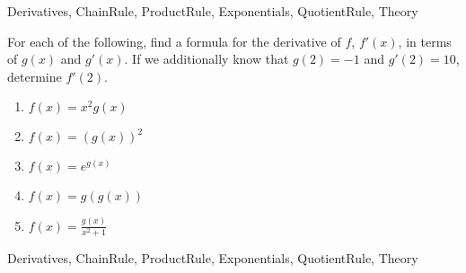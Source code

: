 	
\begin{tagblock}{Derivatives, ChainRule, ProductRule, Exponentials, QuotientRule, Theory}
\begin{question}
	

For each of the following, find a formula for the derivative of $f$, $f'(x)$, in terms of $g(x)$ and $g'(x)$.  If we additionally know that $g(2)=-1$ and $g'(2)=10$, determine $f'(2)$.  

\begin{enumerate}
\item $f(x) = x^2g(x)$ 

\vspace{1.25in}
\item $f(x) = (g(x))^2$

\vspace{1.25in}



\item $f(x) = e^{g(x)}$ 

\vspace{1.25in}

\item $f(x) = g(g(x))$

\vspace{1.25in}

\item $\displaystyle f(x) = \frac{g(x)}{x^2+1}$
\end{enumerate}



	
\begin{tags}
	    Derivatives, ChainRule, ProductRule, Exponentials, QuotientRule, Theory
\end{tags}
	
\begin{diary}
\end{diary}
	
\begin{solution}
	   
\end{solution}
	
\end{question}

\end{tagblock}




